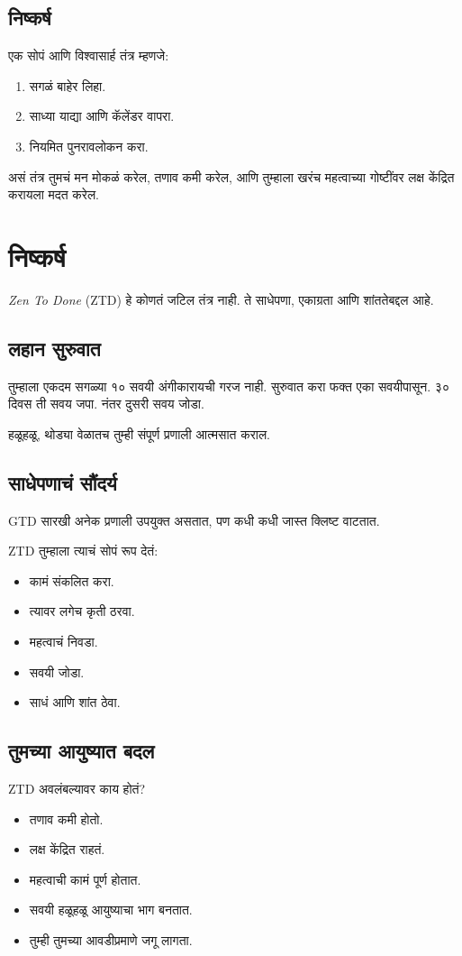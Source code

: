 \section*{निष्कर्ष}
एक सोपं आणि विश्वासार्ह तंत्र म्हणजे:  
\begin{enumerate}
\item सगळं बाहेर लिहा.  
\item साध्या याद्या आणि कॅलेंडर वापरा.  
\item नियमित पुनरावलोकन करा.  
\end{enumerate}

असं तंत्र तुमचं मन मोकळं करेल,  
तणाव कमी करेल,  
आणि तुम्हाला खरंच महत्वाच्या गोष्टींवर लक्ष केंद्रित करायला मदत करेल.  


\chapter{निष्कर्ष}

\textit{Zen To Done} (ZTD) हे कोणतं जटिल तंत्र नाही.  
ते साधेपणा, एकाग्रता आणि शांततेबद्दल आहे.  

\section*{लहान सुरुवात}
तुम्हाला एकदम सगळ्या १० सवयी अंगीकारायची गरज नाही.  
सुरुवात करा फक्त एका सवयीपासून.  
३० दिवस ती सवय जपा.  
नंतर दुसरी सवय जोडा.  

हळूहळू, थोड्या वेळातच  
तुम्ही संपूर्ण प्रणाली आत्मसात कराल.  

\section*{साधेपणाचं सौंदर्य}
GTD सारखी अनेक प्रणाली उपयुक्त असतात,  
पण कधी कधी जास्त क्लिष्ट वाटतात.  

ZTD तुम्हाला त्याचं सोपं रूप देतं:  
\begin{itemize}
\item कामं संकलित करा.  
\item त्यावर लगेच कृती ठरवा.  
\item महत्वाचं निवडा.  
\item सवयी जोडा.  
\item साधं आणि शांत ठेवा.  
\end{itemize}

\section*{तुमच्या आयुष्यात बदल}
ZTD अवलंबल्यावर काय होतं?  
\begin{itemize}
\item तणाव कमी होतो.  
\item लक्ष केंद्रित राहतं.  
\item महत्वाची कामं पूर्ण होतात.  
\item सवयी हळूहळू आयुष्याचा भाग बनतात.  
\item तुम्ही तुमच्या आवडीप्रमाणे जगू लागता.  
\end{itemize}

